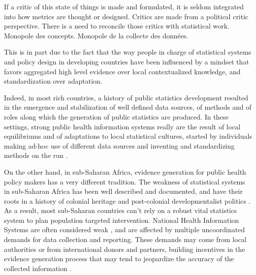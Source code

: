 
If a critic of this state of things is made and formulated, it is seldom integrated into how metrics are thought or designed. Critics are made from a political critic perspective. There is a need to reconcile those critics with statistical work. Monopole des concepts. Monopole de la collecte des données.




This is in part due to the fact that the way people in charge of statistical systems and policy design in developing countries have been influenced by a mindset that favors aggregated high level evidence over local contextualized knowledge, and standardization over adaptation.

Indeed, in most rich countries, a history of public statistics development resulted in the emergence and stabilization of well defined data sources, of methods and of roles along which the generation of public statistics are produced. In these settings, strong public health information systems really are the result of local equilibriums and of adaptations to local statistical cultures, started by individuals making ad-hoc use of different data sources and inventing and standardizing methods on the run \citep{lecuyer_medecins_1987}.

On the other hand, in sub-Saharan Africa, evidence generation for public health policy makers has a very different tradition. The weakness of statistical systems in sub-Saharan Africa has been well described and documented, and have their roots in a history of colonial heritage and post-colonial developmentalist politics \citep{jerven_poor_2013}. As a result, most sub-Saharan countries can't rely on a robust vital statistics system to plan population targeted intervention. National Health Information Systems are often considered weak \citep{abou-zahr_better_2010,kiberu_strengthening_2014}, and are affected by multiple uncoordinated demands for data collection and reporting. These demands may come from local authorities or from international donors and partners, building incentives in the evidence generation process that may tend to jeopardize the accuracy of the collected information \citep{sandefur_political_2013}.

